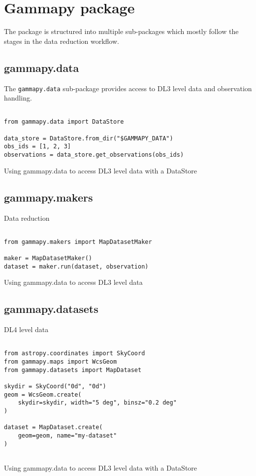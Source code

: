 \section{Gammapy package}
\label{sec:package}

The \gammapy package is structured into multiple sub-packages
which mostly follow the stages in the data reduction workflow.


\subsection{gammapy.data}
The \verb|gammapy.data| sub-package provides access to
DL3 level data and observation handling.


\begin{listing}
\begin{verbatim}

from gammapy.data import DataStore

data_store = DataStore.from_dir("$GAMMAPY_DATA")
obs_ids = [1, 2, 3]
observations = data_store.get_observations(obs_ids)

\end{verbatim}
\caption{Using gammapy.data to access DL3 level data with a DataStore}
\label{codeexample:data}
\end{listing}



\subsection{gammapy.makers}
Data reduction

\begin{listing}
\begin{verbatim}

from gammapy.makers import MapDatasetMaker

maker = MapDatasetMaker()
dataset = maker.run(dataset, observation)

\end{verbatim}
\caption{Using gammapy.data to access DL3 level data}
\label{codeexample:maker}
\end{listing}


\subsection{gammapy.datasets}
DL4 level data


\begin{listing}
\begin{verbatim}

from astropy.coordinates import SkyCoord
from gammapy.maps import WcsGeom
from gammapy.datasets import MapDataset

skydir = SkyCoord("0d", "0d")
geom = WcsGeom.create(
	skydir=skydir, width="5 deg", binsz="0.2 deg"
)

dataset = MapDataset.create(
	geom=geom, name="my-dataset"
)


\end{verbatim}
\caption{Using gammapy.data to access DL3 level data with a DataStore}
\label{codeexample:data}
\end{listing}




